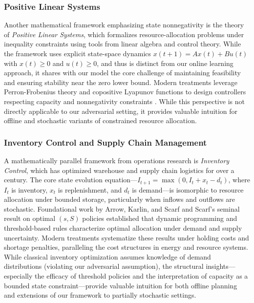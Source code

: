 \documentclass[11pt]{article}
\begin{document}
\subsubsection{Positive Linear Systems}
Another mathematical framework emphasizing state nonnegativity is the theory of \emph{Positive Linear Systems}, which formalizes resource-allocation problems under inequality constraints using tools from linear algebra and control theory. While the framework uses explicit state-space dynamics $x(t+1) = Ax(t) + Bu(t)$ with $x(t)\ge 0$ and $u(t)\ge 0$, and thus is distinct from our online learning approach, it shares with our model the core challenge of maintaining feasibility and ensuring stability near the zero lower bound. Modern treatments leverage Perron-Frobenius theory and copositive Lyapunov functions to design controllers respecting capacity and nonnegativity constraints \cite{farina2000positive,haddad2010nonnegative}. While this perspective is not directly applicable to our adversarial setting, it provides valuable intuition for offline and stochastic variants of constrained resource allocation.

\subsubsection{Inventory Control and Supply Chain Management}
A mathematically parallel framework from operations research is \emph{Inventory Control}, which has optimized warehouse and supply chain logistics for over a century. The core state evolution equation---$I_{t+1} = \max(0, I_t + x_t - d_t)$, where $I_t$ is inventory, $x_t$ is replenishment, and $d_t$ is demand---is isomorphic to resource allocation under bounded storage, particularly when inflows and outflows are stochastic. Foundational work by Arrow, Karlin, and Scarf \cite{arrow1958studies} and Scarf's seminal result on optimal $(s,S)$ policies \cite{scarf1960optimality} established that dynamic programming and threshold-based rules characterize optimal allocation under demand and supply uncertainty. Modern treatments \cite{zipkin2000foundations,porteus2002foundations} systematize these results under holding costs and shortage penalties, paralleling the cost structures in energy and resource systems. While classical inventory optimization assumes knowledge of demand distributions (violating our adversarial assumption), the structural insights---especially the efficacy of threshold policies and the interpretation of capacity as a bounded state constraint---provide valuable intuition for both offline planning and extensions of our framework to partially stochastic settings.
\end{document}
